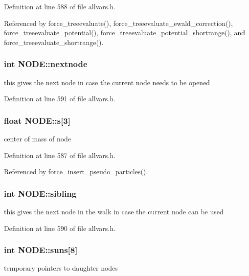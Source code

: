 Definition at line 588 of file allvars.h.



Referenced by force\_\-treeevaluate(), force\_\-treeevaluate\_\-ewald\_\-correction(), force\_\-treeevaluate\_\-potential(), force\_\-treeevaluate\_\-potential\_\-shortrange(), and force\_\-treeevaluate\_\-shortrange().

\hypertarget{structNODE_aabf4865245a8afbec1e1cb8e664f41e8}{
\subsubsection[{nextnode}]{\setlength{\rightskip}{0pt plus 5cm}int {\bf NODE::nextnode}}}
\label{structNODE_aabf4865245a8afbec1e1cb8e664f41e8}
this gives the next node in case the current node needs to be opened 

Definition at line 591 of file allvars.h.

\hypertarget{structNODE_a97ef917e39b0cc8a4aae6e6362c4b3bf}{
\subsubsection[{s}]{\setlength{\rightskip}{0pt plus 5cm}float {\bf NODE::s}\mbox{[}3\mbox{]}}}
\label{structNODE_a97ef917e39b0cc8a4aae6e6362c4b3bf}
center of mass of node 

Definition at line 587 of file allvars.h.



Referenced by force\_\-insert\_\-pseudo\_\-particles().

\hypertarget{structNODE_a0e5a3f58232208e4ad8570f801bf5713}{
\subsubsection[{sibling}]{\setlength{\rightskip}{0pt plus 5cm}int {\bf NODE::sibling}}}
\label{structNODE_a0e5a3f58232208e4ad8570f801bf5713}
this gives the next node in the walk in case the current node can be used 

Definition at line 590 of file allvars.h.

\hypertarget{structNODE_a2a31ed85a69cd67dce1861bd327ac6e9}{
\subsubsection[{suns}]{\setlength{\rightskip}{0pt plus 5cm}int {\bf NODE::suns}\mbox{[}8\mbox{]}}}
\label{structNODE_a2a31ed85a69cd67dce1861bd327ac6e9}
temporary pointers to daughter nodes 

